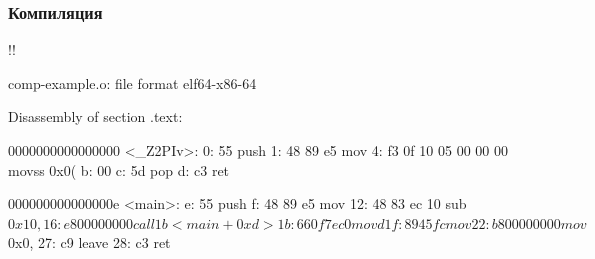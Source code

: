 \documentclass[compress]{beamer}
\begin{document}
\begin{frame}[fragile]

    \frametitle{Компиляция}

        \begin{terminalwindow}
!!

comp-example.o:     file format elf64-x86-64


Disassembly of section .text:

0000000000000000 <_Z2PIv>:
   0:   55                      push   %
   1:   48 89 e5                mov    %
   4:   f3 0f 10 05 00 00 00    movss  0x0(%
   b:   00
   c:   5d                      pop    %
   d:   c3                      ret

000000000000000e <main>:
   e:   55                      push   %
   f:   48 89 e5                mov    %
  12:   48 83 ec 10             sub    $0x10,%
  16:   e8 00 00 00 00          call   1b <main+0xd>
  1b:   66 0f 7e c0             movd   %
  1f:   89 45 fc                mov    %
  22:   b8 00 00 00 00          mov    $0x0,%
  27:   c9                      leave
  28:   c3                      ret
        \end{terminalwindow}

    \centering

\end{frame}
\end{document}
